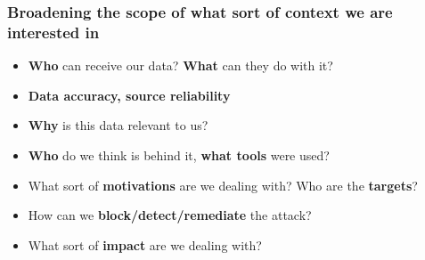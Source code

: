 \begin{frame}
\frametitle{Broadening the scope of what sort of context we are interested in}
\begin{itemize}
       \item {\bf Who} can receive our data? {\bf What} can they do with it?
       \item {\bf Data accuracy, source reliability}
       \item {\bf Why} is this data relevant to us?
       \item {\bf Who} do we think is behind it, {\bf what tools} were used?
       \item What sort of {\bf motivations} are we dealing with? Who are the {\bf targets}?
       \item How can we {\bf block/detect/remediate} the attack?
       \item What sort of {\bf impact} are we dealing with?
\end{itemize}
\end{frame}

